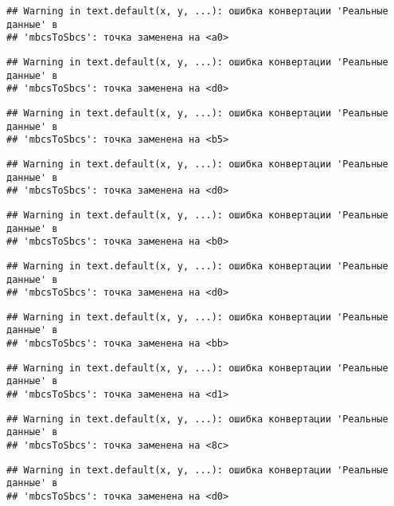 \documentclass[
]{article}
\begin{document}
\begin{verbatim}
## Warning in text.default(x, y, ...): ошибка конвертации 'Реальные данные' в
## 'mbcsToSbcs': точка заменена на <a0>
\end{verbatim}

\begin{verbatim}
## Warning in text.default(x, y, ...): ошибка конвертации 'Реальные данные' в
## 'mbcsToSbcs': точка заменена на <d0>
\end{verbatim}

\begin{verbatim}
## Warning in text.default(x, y, ...): ошибка конвертации 'Реальные данные' в
## 'mbcsToSbcs': точка заменена на <b5>
\end{verbatim}

\begin{verbatim}
## Warning in text.default(x, y, ...): ошибка конвертации 'Реальные данные' в
## 'mbcsToSbcs': точка заменена на <d0>
\end{verbatim}

\begin{verbatim}
## Warning in text.default(x, y, ...): ошибка конвертации 'Реальные данные' в
## 'mbcsToSbcs': точка заменена на <b0>
\end{verbatim}

\begin{verbatim}
## Warning in text.default(x, y, ...): ошибка конвертации 'Реальные данные' в
## 'mbcsToSbcs': точка заменена на <d0>
\end{verbatim}

\begin{verbatim}
## Warning in text.default(x, y, ...): ошибка конвертации 'Реальные данные' в
## 'mbcsToSbcs': точка заменена на <bb>
\end{verbatim}

\begin{verbatim}
## Warning in text.default(x, y, ...): ошибка конвертации 'Реальные данные' в
## 'mbcsToSbcs': точка заменена на <d1>
\end{verbatim}

\begin{verbatim}
## Warning in text.default(x, y, ...): ошибка конвертации 'Реальные данные' в
## 'mbcsToSbcs': точка заменена на <8c>
\end{verbatim}

\begin{verbatim}
## Warning in text.default(x, y, ...): ошибка конвертации 'Реальные данные' в
## 'mbcsToSbcs': точка заменена на <d0>
\end{verbatim}
\end{document}
